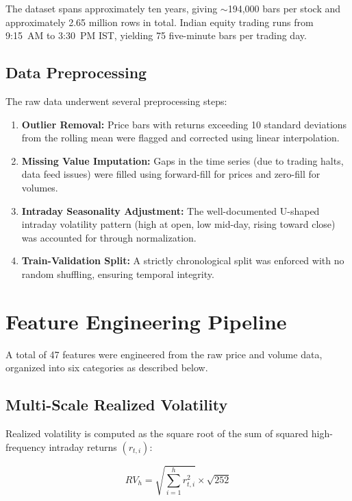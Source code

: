 The dataset spans approximately ten years, giving $\sim$194,000 bars per stock and approximately 2.65 million rows in total. Indian equity trading runs from 9:15~AM to 3:30~PM IST, yielding 75 five-minute bars per trading day.

\subsection{Data Preprocessing}

The raw data underwent several preprocessing steps:

\begin{enumerate}
    \item \textbf{Outlier Removal:} Price bars with returns exceeding 10 standard deviations from the rolling mean were flagged and corrected using linear interpolation.
    \item \textbf{Missing Value Imputation:} Gaps in the time series (due to trading halts, data feed issues) were filled using forward-fill for prices and zero-fill for volumes.
    \item \textbf{Intraday Seasonality Adjustment:} The well-documented U-shaped intraday volatility pattern (high at open, low mid-day, rising toward close) was accounted for through normalization.
    \item \textbf{Train-Validation Split:} A strictly chronological split was enforced with no random shuffling, ensuring temporal integrity.
\end{enumerate}

\section{Feature Engineering Pipeline}

A total of 47 features were engineered from the raw price and volume data, organized into six categories as described below.

\subsection{Multi-Scale Realized Volatility}

Realized volatility is computed as the square root of the sum of squared high-frequency intraday returns $(r_{t,i})$:

\begin{equation}
RV_h = \sqrt{\sum_{i=1}^{h} r_{t,i}^2} \times \sqrt{252}
\end{equation}

